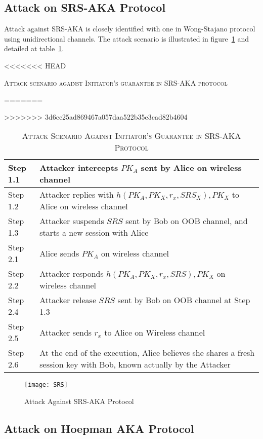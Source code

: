 \subsection{Attack on SRS-AKA Protocol}

Attack against SRS-AKA is closely identified with one in Wong-Stajano protocol using unidirectional channels. The attack scenario is illustrated in figure~\ref{SRSattack} and detailed at table~\ref{SRSattacktable}.

\begin{table}[t]
\centering
<<<<<<< HEAD
\caption{\textsc{Attack scenario against Initiator's guarantee in SRS-AKA protocol}}
=======
\caption{\textsc{Attack Scenario Against Initiator's Guarantee in SRS-AKA Protocol}}
>>>>>>> 3d6cc25ad869467a057daa522b35e3cad82b4604
\label{SRSattacktable}
{\small
\begin{tabular}{| l | p{11cm} |}
 \hline
 Step 1.1 & Attacker intercepts $PK_A$ sent by Alice on wireless channel\\ \hline
 Step 1.2 & Attacker replies with $h(PK_A,PK_X,r_x,SRS_X), PK_X$ to Alice on wireless channel\\ \hline
 Step 1.3 & Attacker suspends $SRS$ sent by Bob on OOB channel, and starts a new session with Alice\\ \hline \hline
 Step 2.1 & Alice sends $PK_A$ on wireless channel\\ \hline
 Step 2.2 & Attacker responds $h(PK_A,PK_X,r_x,SRS), PK_X$  on wireless channel\\ \hline
 Step 2.4 & Attacker release $SRS$ sent by Bob on OOB channel at Step 1.3\\ \hline
 Step 2.5 & Attacker sends $r_x$ to Alice on Wireless channel\\ \hline
 Step 2.6 & At the end of the execution, Alice believes she shares a fresh session key with Bob, known actually by the Attacker\\ \hline
\end{tabular}
}
\end{table}

\begin{figure}
  \centering
  \texttt{[image: SRS]}
  \caption{Attack Against SRS-AKA Protocol}
  \label{SRSattack}
\end{figure}


\subsection{Attack on Hoepman AKA Protocol}

